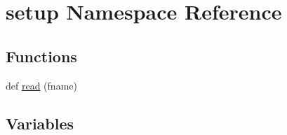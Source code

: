 \hypertarget{namespacesetup}{}\section{setup Namespace Reference}
\label{namespacesetup}
\subsection*{Functions}
\begin{DoxyCompactItemize}
\item 
def \hyperlink{namespacesetup_a45ed25e6d3ed2d5c64905e3e728b582c}{read} (fname)
\end{DoxyCompactItemize}
\subsection*{Variables}
